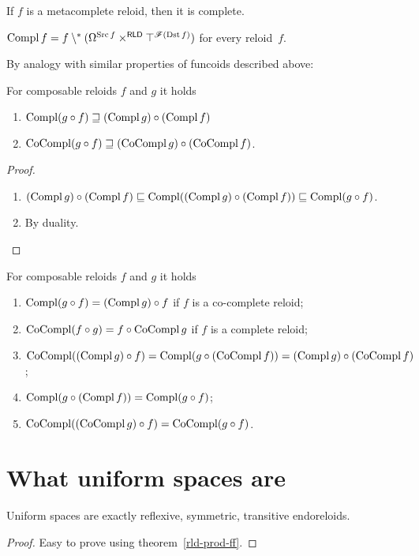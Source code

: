 \begin{conjecture}
If $f$ is a metacomplete reloid, then it is complete.
\end{conjecture}

\begin{conjecture}
$\operatorname{Compl} f=f\setminus^{\ast}(\Omega^{\operatorname{Src} f}\times^{\mathsf{RLD}}\top^{\mathscr{F}(\operatorname{Dst} f)})$
for every reloid~$f$.
\end{conjecture}
By analogy with similar properties of funcoids described above:
\begin{prop}
For composable reloids $f$ and $g$ it holds
\begin{enumerate}
\item $\operatorname{Compl}(g\circ f)\sqsupseteq(\operatorname{Compl} g)\circ(\operatorname{Compl} f)$
\item $\operatorname{CoCompl}(g\circ f)\sqsupseteq(\operatorname{CoCompl} g)\circ(\operatorname{CoCompl} f)$.
\end{enumerate}
\end{prop}
\begin{proof}
~
\begin{enumerate}
\item $(\operatorname{Compl} g)\circ(\operatorname{Compl} f)\sqsubseteq\operatorname{Compl}((\operatorname{Compl} g)\circ(\operatorname{Compl} f))\sqsubseteq\operatorname{Compl}(g\circ f)$.
\item By duality.
\end{enumerate}
\end{proof}
\begin{conjecture}
For composable reloids $f$ and $g$ it holds
\begin{enumerate}
\item $\operatorname{Compl}(g\circ f)=(\operatorname{Compl} g)\circ f$ if $f$ is a co-complete reloid;
\item $\operatorname{CoCompl}(f\circ g)=f\circ\operatorname{CoCompl} g$ if $f$ is a complete reloid;
\item $\operatorname{CoCompl}((\operatorname{Compl} g)\circ f)=\operatorname{Compl}(g\circ(\operatorname{CoCompl} f))=(\operatorname{Compl} g)\circ(\operatorname{CoCompl} f)$;
\item $\operatorname{Compl}(g\circ(\operatorname{Compl} f))=\operatorname{Compl}(g\circ f)$;
\item $\operatorname{CoCompl}((\operatorname{CoCompl} g)\circ f)=\operatorname{CoCompl}(g\circ f)$.
\end{enumerate}
\end{conjecture}

\section{What uniform spaces are}
\begin{prop}
Uniform spaces are exactly
reflexive, symmetric, transitive endoreloids.\end{prop}
\begin{proof}
Easy to prove using theorem~\ref{rld-prod-ff}.\end{proof}

